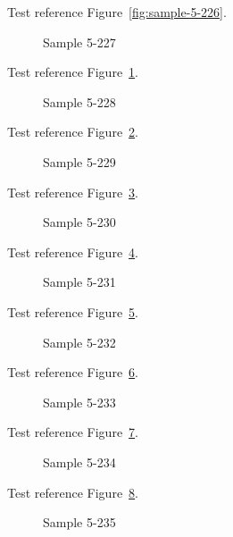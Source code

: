 Test reference Figure~\ref{fig:sample-5-226}.

\begin{figure}[tbhp]
\caption{Sample 5-227}
\label{fig:sample-5-227}
\end{figure}

Test reference Figure~\ref{fig:sample-5-227}.

\begin{figure}[tbhp]
\caption{Sample 5-228}
\label{fig:sample-5-228}
\end{figure}

Test reference Figure~\ref{fig:sample-5-228}.

\begin{figure}[tbhp]
\caption{Sample 5-229}
\label{fig:sample-5-229}
\end{figure}

Test reference Figure~\ref{fig:sample-5-229}.

\begin{figure}[tbhp]
\caption{Sample 5-230}
\label{fig:sample-5-230}
\end{figure}

Test reference Figure~\ref{fig:sample-5-230}.

\begin{figure}[tbhp]
\caption{Sample 5-231}
\label{fig:sample-5-231}
\end{figure}

Test reference Figure~\ref{fig:sample-5-231}.

\begin{figure}[tbhp]
\caption{Sample 5-232}
\label{fig:sample-5-232}
\end{figure}

Test reference Figure~\ref{fig:sample-5-232}.

\begin{figure}[tbhp]
\caption{Sample 5-233}
\label{fig:sample-5-233}
\end{figure}

Test reference Figure~\ref{fig:sample-5-233}.

\begin{figure}[tbhp]
\caption{Sample 5-234}
\label{fig:sample-5-234}
\end{figure}

Test reference Figure~\ref{fig:sample-5-234}.

\begin{figure}[tbhp]
\caption{Sample 5-235}
\label{fig:sample-5-235}
\end{figure}

